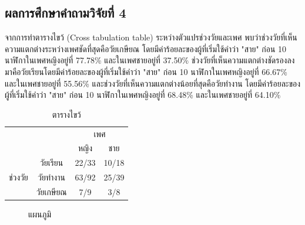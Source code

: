 \documentclass[a4paper]{article}
\begin{document}
\subsection{ผลการศึกษาคำถามวิจัยที่ 4}
    จากการทำตารางไขว้ (Cross tabulation table) ระหว่างตัวแปรช่วงวัยและเพศ พบว่าช่วงวัยที่เห็นความแตกต่างระหว่างเพศชัดที่สุดคือวัยเกษียณ โดยมีค่าร้อยละของผู้ที่เริ่มใช้คำว่า "สาย" ก่อน 10 นาฬิกาในเพศหญิงอยู่ที่ 77.78\% และในเพศชายอยู่ที่ 37.50\% ช่วงวัยที่เห็นความแตกต่างชัดรองลงมาคือวัยเรียนโดยมีค่าร้อยละของผู้ที่เริ่มใช้คำว่า "สาย" ก่อน 10 นาฬิกาในเพศหญิงอยู่ที่ 66.67\% และในเพศชายอยู่ที่ 55.56\% และช่วงวัยที่เห็นความแตกต่างน้อยที่สุดคือวัยทำงาน โดยมีค่าร้อยละของผู้ที่เริ่มใช้คำว่า "สาย" ก่อน 10 นาฬิกาในเพศหญิงอยู่ที่ 68.48\% และในเพศชายอยู่ที่ 64.10\%
    \begin{table}[!ht]
        \begin{center}
        \begin{tabular}{|c|c|c|c|}
            \cline{3-4}
            \multicolumn{2}{c|}{} & \multicolumn{2}{c|}{เพศ} \\
            \cline{3-4}
            \multicolumn{2}{c|}{} & หญิง & ชาย \\
            \hline
            \multirow{3}{*}{ช่วงวัย} & วัยเรียน & 22/33 & 10/18 \\
            \cline{2-4}
            & วัยทำงาน & 63/92 & 25/39 \\
            \cline{2-4}
            & วัยเกษียณ & 7/9 & 3/8 \\
            \hline
        \end{tabular}
        \end{center}
        \caption{ตารางไขว้}
    \end{table}
    \begin{figure}[!ht]
        \begin{center}
        \end{center}
        \caption{แผนภูมิ}
    \end{figure}
\end{document}
